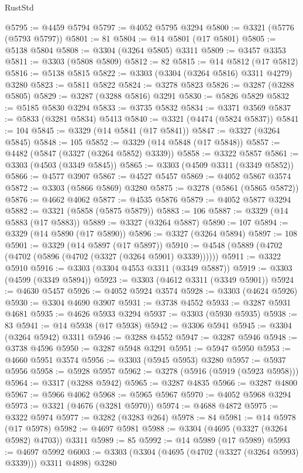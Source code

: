 \begin{lexlean}{RustStd}
\begin{coremodule}
@5795 := @4459 @5794
@5797 := @4052 @5795 @3294
@5800 := @3321 (@5776 (@5793 @5797))
@5801 := 81
@5804 := @14 @5801 (@17 @5801)
@5805 := @5138 @5804
@5808 := @3304 (@3264 @5805) @3311
@5809 := @3457 @3353
@5811 := @3303 (@5808 @5809)
@5812 := 82
@5815 := @14 @5812 (@17 @5812)
@5816 := @5138 @5815
@5822 := @3303 (@3304 (@3264 @5816) @3311 @4279) @3280
@5823 := @5811 @5822
@5824 := @3278 @5823
@5826 := @3287 (@3288 @5805)
@5829 := @3287 (@3288 @5816) @3291
@5830 := @5826 @5829
@5832 := @5185 @5830 @3294
@5833 := @3735 @5832
@5834 := @3371 @3569
@5837 := @5833 (@3281 @5834) @5413
@5840 := @3321 (@4474 (@5824 @5837))
@5841 := 104
@5845 := @3329 (@14 @5841 (@17 @5841))
@5847 := @3327 (@3264 @5845)
@5848 := 105
@5852 := @3329 (@14 @5848 (@17 @5848))
@5857 := @4482 (@5847 (@3327 (@3264 @5852) @3339))
@5858 := @3322 @5857
@5861 := @3303 (@4503 (@3349 @5845))
@5865 := @3303 (@4509 @3311 (@3349 @5852))
@5866 := @4577 @3907
@5867 := @4527 @5457
@5869 := @4052 @5867 @3574
@5872 := @3303 (@5866 @5869) @3280
@5875 := @3278 (@5861 (@5865 @5872))
@5876 := @4662 @4062
@5877 := @4535 @5876
@5879 := @4052 @5877 @3294
@5882 := @3321 (@5858 (@5875 @5879))
@5883 := 106
@5887 := @3329 (@14 @5883 (@17 @5883))
@5889 := @3327 (@3264 @5887)
@5890 := 107
@5894 := @3329 (@14 @5890 (@17 @5890))
@5896 := @3327 (@3264 @5894)
@5897 := 108
@5901 := @3329 (@14 @5897 (@17 @5897))
@5910 := @4548 (@5889 (@4702 (@4702 (@5896 (@4702 (@3327 (@3264 @5901) @3339))))))
@5911 := @3322 @5910
@5916 := @3303 (@3304 @4553 @3311 (@3349 @5887))
@5919 := @3303 (@4599 (@3349 @5894))
@5923 := @3303 (@4612 @3311 (@3349 @5901))
@5924 := @4630 @5457
@5926 := @4052 @5924 @3574
@5928 := @3303 (@4624 @5926)
@5930 := @3304 @4690 @3907
@5931 := @3738 @4552
@5933 := @3287 @5931 @4681
@5935 := @4626 @5933 @3294
@5937 := @3303 (@5930 @5935)
@5938 := 83
@5941 := @14 @5938 (@17 @5938)
@5942 := @3306 @5941
@5945 := @3304 (@3264 @5942) @3311
@5946 := @3288 @4552
@5947 := @3287 @5946
@5948 := @3738 @4596
@5950 := @3287 @5948 @3291
@5951 := @5947 @5950
@5953 := @4660 @5951 @3574
@5956 := @3303 (@5945 @5953) @3280
@5957 := @5937 @5956
@5958 := @5928 @5957
@5962 := @3278 (@5916 (@5919 (@5923 @5958)))
@5964 := @3317 (@3288 @5942)
@5965 := @3287 @4835
@5966 := @3287 @4800
@5967 := @5966 @4062
@5968 := @5965 @5967
@5970 := @4052 @5968 @3294
@5973 := @3321 (@4676 (@3281 @5970))
@5974 := @4688 @4872
@5975 := @3322 @5974
@5977 := @3282 (@3283 @264)
@5978 := 84
@5981 := @14 @5978 (@17 @5978)
@5982 := @4697 @5981
@5988 := @3304 (@4695 (@3327 (@3264 @5982) @4703)) @3311
@5989 := 85
@5992 := @14 @5989 (@17 @5989)
@5993 := @4697 @5992
@6003 := @3303 (@3304 (@4695 (@4702 (@3327 (@3264 @5993) @3339))) @3311 @4898) @3280

\end{coremodule}
\end{lexlean}
